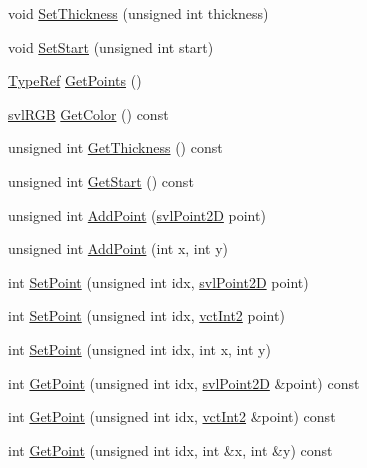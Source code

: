 \begin{DoxyCompactItemize}
\item 
void \hyperlink{classsvl_overlay_static_poly_a17ed37cc56d58040d1d12c0fe85e94ae}{Set\+Thickness} (unsigned int thickness)
\item 
void \hyperlink{classsvl_overlay_static_poly_ae8ae725ac8c1e75d6a3e3ace3c9004a5}{Set\+Start} (unsigned int start)
\item 
\hyperlink{classsvl_overlay_static_poly_a2d317856c0cec72b3a76252446a85944}{Type\+Ref} \hyperlink{classsvl_overlay_static_poly_a2c472b602380bb58381f46cd29f63560}{Get\+Points} ()
\item 
\hyperlink{structsvl_r_g_b}{svl\+R\+G\+B} \hyperlink{classsvl_overlay_static_poly_a17e72ba1edf6899cd9fb50003096dfed}{Get\+Color} () const 
\item 
unsigned int \hyperlink{classsvl_overlay_static_poly_ab31338f864db98e07bbc2a112a646f1e}{Get\+Thickness} () const 
\item 
unsigned int \hyperlink{classsvl_overlay_static_poly_a372b4710b5f097e2d329799edaa404be}{Get\+Start} () const 
\item 
unsigned int \hyperlink{classsvl_overlay_static_poly_a39fdc3924a9b3cf2ff4a624cfa5e734e}{Add\+Point} (\hyperlink{structsvl_point2_d}{svl\+Point2\+D} point)
\item 
unsigned int \hyperlink{classsvl_overlay_static_poly_af9f62fde7c3bd1722ad13ba6d603fe25}{Add\+Point} (int x, int y)
\item 
int \hyperlink{classsvl_overlay_static_poly_aea5063322c51e650423148cbb44bc646}{Set\+Point} (unsigned int idx, \hyperlink{structsvl_point2_d}{svl\+Point2\+D} point)
\item 
int \hyperlink{classsvl_overlay_static_poly_ada71c95d74bf8d811cad2c6bf7f107f6}{Set\+Point} (unsigned int idx, \hyperlink{vct_fixed_size_vector_types_8h_add8c88eb6a432b15f14b866b9c35325f}{vct\+Int2} point)
\item 
int \hyperlink{classsvl_overlay_static_poly_a2a908bda90c76d762df2444dd7ba7b36}{Set\+Point} (unsigned int idx, int x, int y)
\item 
int \hyperlink{classsvl_overlay_static_poly_a1366411fffae2fec8f98c3740d8e64cf}{Get\+Point} (unsigned int idx, \hyperlink{structsvl_point2_d}{svl\+Point2\+D} \&point) const 
\item 
int \hyperlink{classsvl_overlay_static_poly_a38888e6f59acab87848db8f4c5e3efd0}{Get\+Point} (unsigned int idx, \hyperlink{vct_fixed_size_vector_types_8h_add8c88eb6a432b15f14b866b9c35325f}{vct\+Int2} \&point) const 
\item 
int \hyperlink{classsvl_overlay_static_poly_aaecd993bf9cac7c946db90bcc18b6e2e}{Get\+Point} (unsigned int idx, int \&x, int \&y) const 
\end{DoxyCompactItemize}
